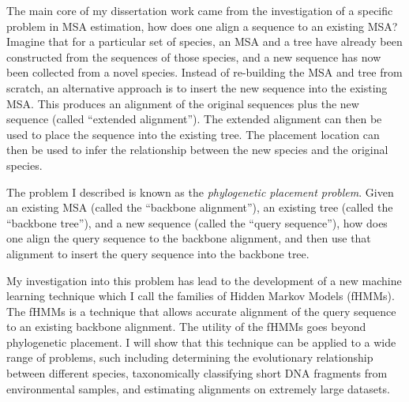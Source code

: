 The main core of my dissertation work came from the investigation of a specific problem in MSA estimation, how does one align a sequence to an existing MSA?  Imagine that for a particular set of species, an MSA and a tree have already been constructed from the sequences of those species, and a new sequence has now been collected from a novel species.  Instead of re-building the MSA and tree from scratch, an alternative approach is to insert the new sequence into the existing MSA.  This produces an alignment of the original sequences plus the new sequence (called ``extended alignment'').  The extended alignment can then be used to place the sequence into the existing tree.  The placement location can then be used to infer the relationship between the new species and the original species.  

The problem I described is known as the \emph{phylogenetic placement problem}.  Given an existing MSA (called the ``backbone alignment''), an existing tree (called the ``backbone tree''), and a new sequence (called the ``query sequence''), how does one align the query sequence to the backbone alignment, and then use that alignment to insert the query sequence into the backbone tree.  

My investigation into this problem has lead to the development of a new machine learning technique which I call the families of Hidden Markov Models (fHMMs).  The fHMMs is a technique that allows accurate alignment of the query sequence to an existing backbone alignment.  The utility of the fHMMs goes beyond phylogenetic placement.  I will show that this technique can be applied to a wide range of problems, such including determining the evolutionary relationship between different species, taxonomically classifying short DNA fragments from environmental samples, and estimating alignments on extremely large datasets.

